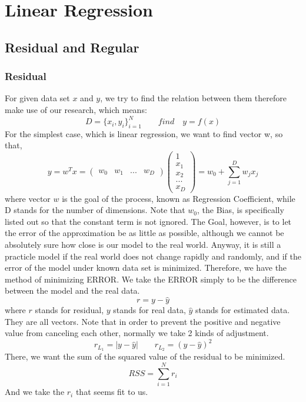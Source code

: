\documentclass{article}
\begin{document}
\section{Linear Regression}
\subsection{Residual and Regular}
	\subsubsection{Residual}
	For given data set $x$ and $y$, we try to find the relation between them therefore make use of our research, which means:
	\begin{displaymath}
		D=\{x_i, y_i\}^N_{i=1}\qquad find \quad y = f(x)
	\end{displaymath}
	For the simplest case, which is linear regression, we want to find vector w, so that,
	\begin{displaymath}
		y = w^Tx=\begin{pmatrix}
		w_0 & w_1 & ... & w_D
		\end{pmatrix}
		\begin{pmatrix}
		1 \\ x_1 \\ x_2 \\ ... \\ x_D
		\end{pmatrix}
		= w_0 + \sum_{j=1}^{D}w_jx_j
	\end{displaymath}
	where vector $w$ is the goal of the process, known as Regression Coefficient, while D stands for the number of dimensions. Note that $w_0$, the Bias, is specifically listed out so that the constant term is not ignored.
	The Goal, however, is to let the error of the approximation be as little as possible, although we cannot be absolutely sure how close is our model to the real world. Anyway, it is still a practicle model if the real world does not change rapidly and randomly, and if the error of the model under known data set is minimized. Therefore, we have the method of minimizing ERROR. We take the ERROR simply to be the difference between the model and the real data.
	\begin{displaymath}
		r=y-\hat{y}
	\end{displaymath}
	where $r$ stands for residual, $y$ stands for real data, $\hat{y}$ stands for estimated data. They are all vectors. Note that in order to prevent the positive and negative value from canceling each other, normally we take 2 kinds of adjustment.
	\begin{displaymath}
		r_{L_1} = |y - \hat{y}|\qquad r_{L_2} = (y - \hat{y})^2
	\end{displaymath}
	There, we want the sum of the squared value of the residual to be minimized.
	\begin{displaymath}
		RSS = \sum_{i=1}^{N}r_i
	\end{displaymath}
	And we take the $r_i$ that seems fit to us.
\end{document}
